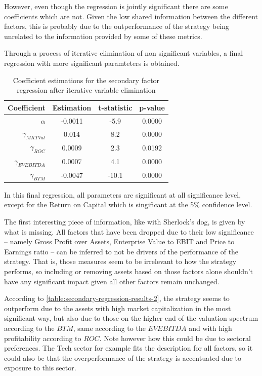 However, even though the regression is jointly significant there are some coefficients which are not. Given the low shared information between the different factors, this is probably due to the outperformance of the strategy being unrelated to the information provided by some of these metrics. 

Through a process of iterative elimination of non significant variables, a final regression with more significant paramteters is obtained. 

\begin{table}[ht]
    \centering
    \begin{tabular}{rccc}
        \toprule
        Coefficient & Estimation & t-statistic & p-value \\ 
        \midrule
        $\alpha$ & -0.0011 & -5.9 & 0.0000 \\
        $\gamma_{MKTVal}$ & 0.014 & 8.2 & 0.0000 \\
        $\gamma_{ROC}$ & 0.0009 & 2.3 & 0.0192 \\
        $\gamma_{EVEBITDA}$ & 0.0007 & 4.1 & 0.0000 \\
        $\gamma_{BTM}$ & -0.0047 & -10.1 & 0.0000 \\
        \bottomrule
    \end{tabular}
    \captionsetup{justification=centering}
    \caption{Coefficient estimations for the secondary factor regression after iterative variable elimination}
    \label{table:secondary-regression-results-2}
\end{table}

In this final regression, all parameters are significant at all significance level, except for the Return on Capital which is singificant at the 5\% confidence level. 

The first interesting piece of information, like with Sherlock's dog, is given by what is missing. All factors that have been dropped due to their low significance -- namely Gross Profit over Assets, Enterprise Value to EBIT and Price to Earnings ratio -- can be inferred to not be drivers of the performance of the strategy. That is, those measures seem to be irrelevant to how the strategy performs, so including or removing assets based on those factors alone shouldn't have any significant impact given all other factors remain unchanged. 

According to \autoref{table:secondary-regression-results-2}, the strategy seems to outperform due to the assets with high market capitalization in the most significant way, but also due to those on the higher end of the valuation spectrum according to the $BTM$, same according to the $EVEBITDA$ and  with high profitability according to $ROC$. Note however how this could be due to sectoral preferences. The Tech sector for example fits the description for all factors, so it could also be that the overperformance of the strategy is accentuated due to exposure to this sector. 
